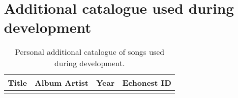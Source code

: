 \chapter{Additional catalogue used during development} 

\label{AppendixD} 


\begin{center}
\begin{longtable}{| p{} | p{} | p{} | p{} |} 
\hline
\textbf{Title} & \textbf{Album Artist} & \textbf{Year} & \textbf{Echonest ID} \\ \hline
\caption[Personal catalogue of songs]{Personal additional catalogue of songs used during development.}
\label{table:personalCatalogue}
\end{longtable}
\end{center}
